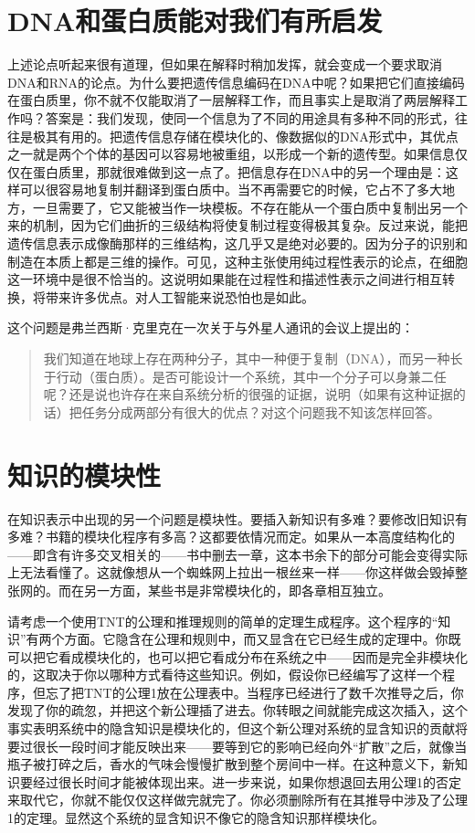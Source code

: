 \section{DNA和蛋白质能对我们有所启发}

上述论点听起来很有道理，但如果在解释时稍加发挥，就会变成一个要求取消DNA和RNA的论点。为什么要把遗传信息编码在DNA中呢？如果把它们直接编码在蛋白质里，你不就不仅能取消了一层解释工作，而且事实上是取消了两层解释工作吗？答案是：我们发现，使同一个信息为了不同的用途具有多种不同的形式，往往是极其有用的。把遗传信息存储在模块化的、像数据似的DNA形式中，其优点之一就是两个个体的基因可以容易地被重组，以形成一个新的遗传型。如果信息仅仅在蛋白质里，那就很难做到这一点了。把信息存在DNA中的另一个理由是：这样可以很容易地复制并翻译到蛋白质中。当不再需要它的时候，它占不了多大地方，一旦需要了，它又能被当作一块模板。不存在能从一个蛋白质中复制出另一个来的机制，因为它们曲折的三级结构将使复制过程变得极其复杂。反过来说，能把遗传信息表示成像酶那样的三维结构，这几乎又是绝对必要的。因为分子的识别和制造在本质上都是三维的操作。可见，这种主张使用纯过程性表示的论点，在细胞这一环境中是很不恰当的。这说明如果能在过程性和描述性表示之间进行相互转换，将带来许多优点。对人工智能来说恐怕也是如此。

这个问题是弗兰西斯·克里克在一次关于与外星人通讯的会议上提出的：

\begin{quote}
我们知道在地球上存在两种分子，其中一种便于复制（DNA），而另一种长于行动（蛋白质）。是否可能设计一个系统，其中一个分子可以身兼二任呢？还是说也许存在来自系统分析的很强的证据，说明（如果有这种证据的话）把任务分成两部分有很大的优点？对这个问题我不知该怎样回答。
\end{quote}

\section{知识的模块性}

在知识表示中出现的另一个问题是模块性。要插入新知识有多难？要修改旧知识有多难？书籍的模块化程序有多高？这都要依情况而定。如果从一本高度结构化的——即含有许多交叉相关的——书中删去一章，这本书余下的部分可能会变得实际上无法看懂了。这就像想从一个蜘蛛网上拉出一根丝来一样——你这样做会毁掉整张网的。而在另一方面，某些书是非常模块化的，即各章相互独立。

请考虑一个使用TNT的公理和推理规则的简单的定理生成程序。这个程序的“知识”有两个方面。它隐含在公理和规则中，而又显含在它已经生成的定理中。你既可以把它看成模块化的，也可以把它看成分布在系统之中——因而是完全非模块化的，这取决于你以哪种方式看待这些知识。例如，假设你已经编写了这样一个程序，但忘了把TNT的公理1放在公理表中。当程序已经进行了数千次推导之后，你发现了你的疏忽，并把这个新公理插了进去。你转眼之间就能完成这次插入，这个事实表明系统中的隐含知识是模块化的，但这个新公理对系统的显含知识的贡献将要过很长一段时间才能反映出来——要等到它的影响已经向外“扩散”之后，就像当瓶子被打碎之后，香水的气味会慢慢扩散到整个房间中一样。在这种意义下，新知识要经过很长时间才能被体现出来。进一步来说，如果你想退回去用公理1的否定来取代它，你就不能仅仅这样做完就完了。你必须删除所有在其推导中涉及了公理1的定理。显然这个系统的显含知识不像它的隐含知识那样模块化。

